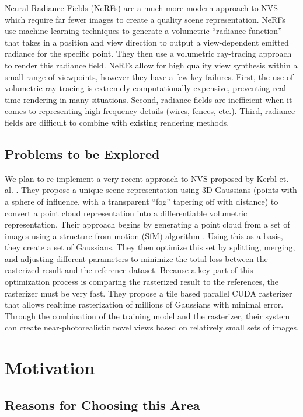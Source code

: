 \documentclass[12pt, a4paper, twocolumn]{article}
\begin{document}
Neural Radiance Fields (NeRFs) are a much more modern approach to NVS which require far fewer images to create a quality scene representation. NeRFs use machine learning techniques to generate a volumetric ``radiance function'' that takes in a position and view direction to output a view-dependent emitted radiance for the specific point. They then use a volumetric ray-tracing approach to render this radiance field. NeRFs allow for high quality view synthesis within a small range of viewpoints, however they have a few key failures. First, the use of volumetric ray tracing is extremely computationally expensive, preventing real time rendering in many situations. Second, radiance fields are inefficient when it comes to representing high frequency details (wires, fences, etc.). Third, radiance fields are difficult to combine with existing rendering methods.

\subsection{Problems to be Explored}

We plan to re-implement a very recent approach to NVS proposed by Kerbl et. al. \cite{kerbl20233d}. They propose a unique scene representation using 3D Gaussians (points with a sphere of influence, with a transparent ``fog'' tapering off with distance) to convert a point cloud representation into a differentiable volumetric representation. Their approach begins by generating a point cloud from a set of images using a structure from motion (SfM) algorithm \cite{Ko2016PointCG}. Using this as a basis, they create a set of Gaussians. They then optimize this set by splitting, merging, and adjusting different parameters to minimize the total loss between the rasterized result and the reference dataset. Because a key part of this optimization process is comparing the rasterized result to the references, the rasterizer must be very fast. They propose a tile based parallel CUDA rasterizer that allows realtime rasterization of millions of Gaussians with minimal error. Through the combination of the training model and the rasterizer, their system can create near-photorealistic novel views based on relatively small sets of images.

\section{Motivation}

\subsection{Reasons for Choosing this Area}
\end{document}

